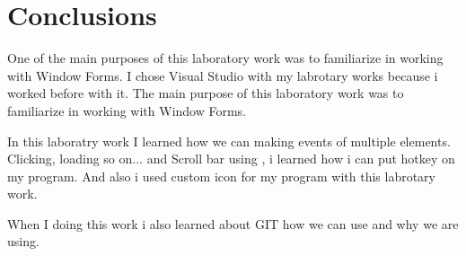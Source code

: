 \section*{Conclusions}

One of the main purposes of this laboratory work was to familiarize in working with Window Forms. 
I chose Visual Studio with my labrotary works because i worked before with it. 
The main purpose of this laboratory work was to familiarize in working with Window Forms.

In this laboratry work I learned how we can making events of multiple elements. Clicking, loading so on... and Scroll bar using , i learned how i can put hotkey on my program.
And also i used custom icon for my program with this labrotary work. 

When I doing this work i also learned about GIT how we can use and why we are using.

\clearpage